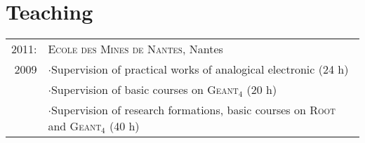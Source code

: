 \documentclass[a4paper,10pt]{article}
\begin{document}
\section{Teaching}
\begin{tabular}{r|l}
 2011:&\textsc{Ecole des Mines de Nantes}, Nantes \\
 2009&$\cdot$Supervision of practical works of analogical electronic (24 h)\\
 &$\cdot$Supervision of basic courses on \textsc{Geant}$_4$ (20 h)\\
 &$\cdot$Supervision of research formations, basic courses on \textsc{Root} and \textsc{Geant}$_4$ (40 h) 
\end{tabular}
\end{document}
